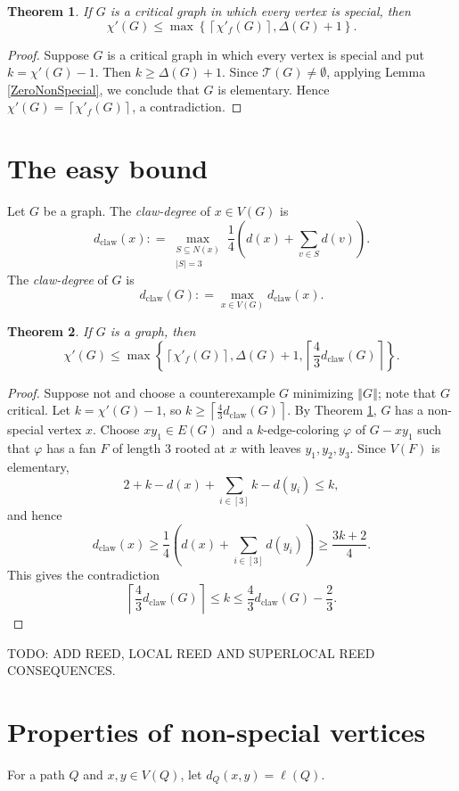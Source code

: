 \documentclass[12pt]{amsart}
\theoremstyle{plain}
\newtheorem{thm}{Theorem}
\theoremstyle{definition}
\theoremstyle{remark}
\newcommand{\fancy}[1]{\mathcal{#1}}
\newcommand{\T}{\fancy{T}}
\newcommand{\set}[1]{\left\{ #1 \right\}}
\newcommand{\card}[1]{\left|#1\right|}
\newcommand{\size}[1]{\left\Vert#1\right\Vert}
\newcommand{\ceil}[1]{\left\lceil#1\right\rceil}
\newcommand{\irange}[1]{\left[#1\right]}
\newcommand{\parens}[1]{\left( #1 \right)}
\newcommand{\DefinedAs}{\mathrel{\mathop:}=}
\newcommand{\dclaw}[1]{d_{\text{claw}}\left( #1 \right)}
\newcommand{\vph}{\varphi}
\begin{document}
\begin{thm}\label{AllSpecialImpliesElementary}
If $G$ is a critical graph in which every vertex is special, then
\[\chi'(G) \le \max \set{\ceil{\chi'_f(G)}, \Delta(G) + 1}.\]
\end{thm}
\begin{proof}
Suppose $G$ is a critical graph in which every vertex is special and put $k = \chi'(G) - 1$.  Then $k \ge \Delta(G) + 1$.
Since $\T(G) \ne \emptyset$, applying Lemma \ref{ZeroNonSpecial}, we conclude that $G$ is elementary.  Hence $\chi'(G) = \ceil{\chi'_f(G)}$, a contradiction.
\end{proof}

\section{The easy bound}
Let $G$ be a graph.  The \emph{claw-degree} of $x \in V(G)$ is 
\[\dclaw{x} \DefinedAs \max_{\substack{S \subseteq N(x) \\ \card{S} = 3}}\frac14 \parens{d(x) + \sum_{v \in S} d(v)}.\]
The \emph{claw-degree} of $G$ is 
\[\dclaw{G} \DefinedAs \max_{x \in V(G)} \dclaw{x}.\]
\begin{thm}\label{EasyBound}
If $G$ is a graph, then
\[\chi'(G) \le \max\set{\ceil{\chi'_f(G)}, \Delta(G) + 1, \ceil{\frac43\dclaw{G}}}.\]
\end{thm}
\begin{proof}
Suppose not and choose a counterexample $G$ minimizing $\size{G}$; note that $G$ critical. 
Let $k=\chi'(G)-1$, so $k \ge \ceil{\frac43\dclaw{G}}$. 
By Theorem \ref{AllSpecialImpliesElementary}, $G$ has a non-special vertex $x$.
Choose $xy_1 \in E(G)$ and a $k$-edge-coloring $\vph$ of $G - xy_1$ such that
$\vph$ has a fan $F$ of length $3$ rooted at $x$ with leaves $y_1, y_2, y_3$.  
Since $V(F)$ is elementary, 
\[2 + k - d(x) + \sum_{i \in \irange{3}} k-d(y_i) \le k,\]
and hence
\[\dclaw{x} \ge \frac14\parens{d(x) + \sum_{i \in \irange{3}} d(y_i)} \ge \frac{3k+2}{4}.\]
This gives the contradiction
\[\ceil{\frac43\dclaw{G}} \le k \le \frac43\dclaw{G} - \frac23.\]
\end{proof}

TODO: ADD REED, LOCAL REED AND SUPERLOCAL REED CONSEQUENCES.

\section{Properties of non-special vertices}
For a path $Q$ and $x,y \in V(Q)$, let $d_Q(x,y) = \ell(Q)$.
\end{document}
